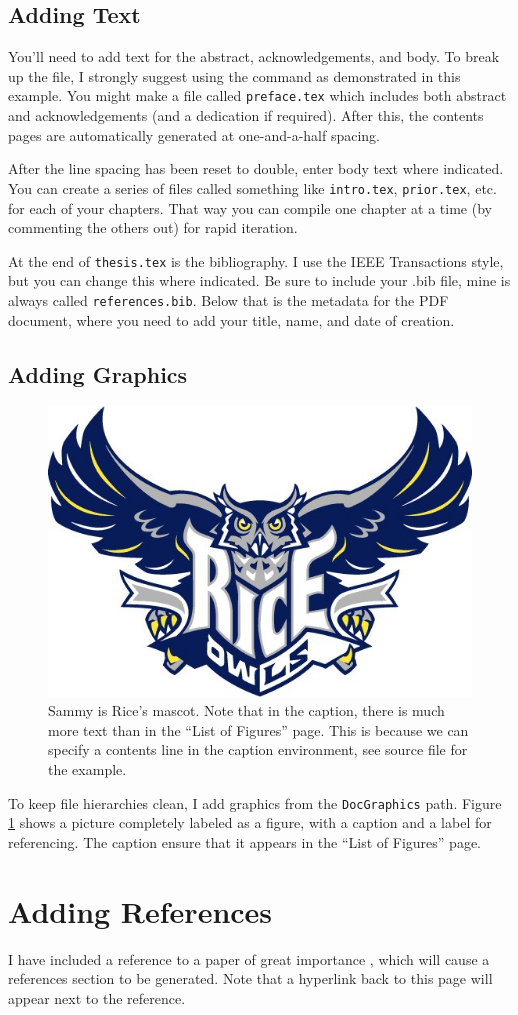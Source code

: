 \subsection{Adding Text}

You'll need to add text for the abstract, acknowledgements, and body.  To break up the file, I strongly suggest using the \verb++ command as demonstrated in this example.  You might make a file called \verb+preface.tex+ which includes both abstract and acknowledgements (and a dedication if required).  After this, the contents pages are automatically generated at one-and-a-half spacing.

After the line spacing has been reset to double, enter body text where indicated.  You can create a series of files called something like \verb+intro.tex+, \verb+prior.tex+, etc. for each of your chapters.  That way you can compile one chapter at a time (by commenting the others out) for rapid iteration.

At the end of \verb+thesis.tex+ is the bibliography.  I use the IEEE Transactions style, but you can change this where indicated.  Be sure to include your .bib file, mine is always called \verb+references.bib+.  Below that is the metadata for the PDF document, where you need to add your title, name, and date of creation.

\subsection{Adding Graphics}

\begin{figure}
	\center
	\includegraphics [width=.3\textwidth] {./DocGraphics/sammy.jpg}
	\caption[Go Owls]{Sammy is Rice's mascot.  Note that in the caption, there is much more text than in the ``List of Figures'' page.  This is because we can specify a contents line in the caption environment, see source file for the example.}
	\label{fig:ricelogo}
\end{figure}

To keep file hierarchies clean, I add graphics from the \verb+DocGraphics+ path.  Figure \ref{fig:ricelogo} shows a picture completely labeled as a figure, with a caption and a label for referencing.  The caption ensure that it appears in the ``List of Figures'' page.

\section{Adding References}

I have included a reference to a paper of great importance \cite{Zelst:GreatMeaning}, which will cause a references section to be generated.  Note that a hyperlink back to this page will appear next to the reference.

% 
